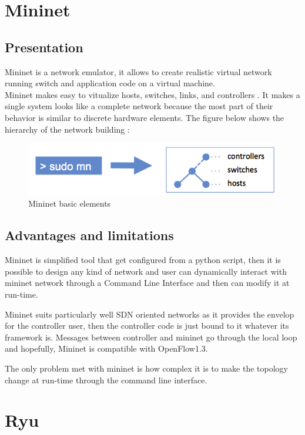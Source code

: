 \documentclass{article}
\begin{document}
\section{Mininet}

\subsection{Presentation}
Mininet is a network emulator, it allows to create realistic virtual
network running switch and application code on a virtual
machine.\\
\newline
Mininet makes easy to vitualize hosts, switches, links, and
controllers . It makes a single system looks like a complete network
because the most part of their behavior is similar to discrete
hardware elements.  The figure below shows the hierarchy of the
network building :

\begin{figure}[h!]
  \centering
    \includegraphics[scale=0.5]{reportPictures/figure9.png}
  \caption{Mininet basic elements}
\end{figure}

\subsection{Advantages and limitations}

Mininet is simplified tool that get configured from a python script,
then it is possible to design any kind of network and user can
dynamically interact with mininet network through a Command Line
Interface and then can modify it at run-time.

Mininet suits particularly well SDN oriented networks as it provides
the envelop for the controller user, then the controller code is just
bound to it whatever its framework is. Messages between controller and
mininet go through the local loop and hopefully, Mininet is compatible
with OpenFlow1.3.

The only problem met with mininet is how complex it is to make the
topology change at run-time through the command line interface.

\section{Ryu}
\end{document}
